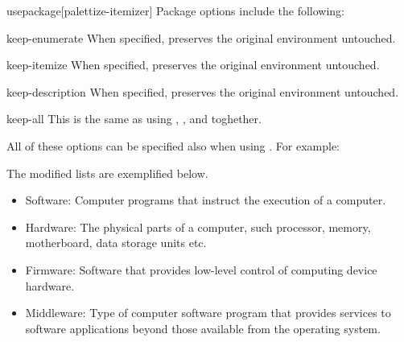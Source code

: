 \documentclass[a4paper, 11pt]{article}
\begin{document}
\begin{macro*}{usepackage}{}[palettize-itemizer]
    Package options include the following:

    \begin{option}{keep-enumerate}{}
        When specified,  preserves the original  environment untouched.
    \end{option}

    \begin{option}{keep-itemize}{}
        When specified,  preserves the original  environment untouched.
    \end{option}

    \begin{option}{keep-description}{}
        When specified,  preserves the original  environment untouched.
    \end{option}

    \begin{option}{keep-all}{}
        This is the same as using , , and  toghether.
    \end{option}

    All of these options can be specified also when using \latexinline{\usepackage{palettize}}. For example:

    \begin{latexcode}
        \usepackage[itemizer, keep-description]{palettize}
    \end{latexcode}
\end{macro*}

The modified lists are exemplified below.

\begin{tcblisting}{}
    \begin{itemize}
        \item Software: Computer programs that instruct the execution of a computer.
        \item Hardware: The physical parts of a computer, such processor, memory, motherboard, data storage units etc.
        \item Firmware: Software that provides low-level control of computing device hardware.
        \item Middleware: Type of computer software program that provides services to software applications beyond those available from the operating system.
    \end{itemize}
\end{tcblisting}
\end{document}
